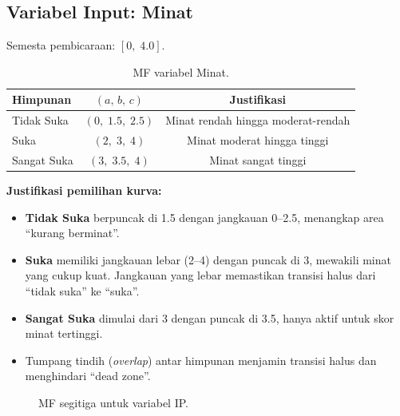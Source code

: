 \documentclass[conference]{IEEEtran}
\begin{document}
\subsection{Variabel Input: Minat}

Semesta pembicaraan: $[0,\;4.0]$.

\begin{table}[htbp]
\centering\caption{MF variabel Minat.}
\label{tab:mf-minat}
\begin{tabular}{@{}lcc@{}}
\toprule
Himpunan & $(a,\,b,\,c)$ & Justifikasi \\
\midrule
Tidak Suka  & $(0,\;1.5,\;2.5)$ & Minat rendah hingga moderat-rendah \\
Suka        & $(2,\;3,\;4)$          & Minat moderat hingga tinggi \\
Sangat Suka & $(3,\;3.5,\;4)$      & Minat sangat tinggi \\
\bottomrule
\end{tabular}
\end{table}

\noindent\textbf{Justifikasi pemilihan kurva:}
\begin{itemize}[nosep,leftmargin=*]
  \item \textbf{Tidak Suka} berpuncak di 1.5 dengan jangkauan
        0--2.5, menangkap area ``kurang berminat''.
  \item \textbf{Suka} memiliki jangkauan lebar (2--4) dengan puncak
        di 3, mewakili minat yang cukup kuat. Jangkauan yang lebar
        memastikan transisi halus dari ``tidak suka'' ke ``suka''.
  \item \textbf{Sangat Suka} dimulai dari 3 dengan puncak di 3.5,
        hanya aktif untuk skor minat tertinggi.
  \item Tumpang tindih (\emph{overlap}) antar himpunan menjamin
        transisi halus dan menghindari ``dead zone''.
\end{itemize}

\begin{figure}[htbp]
\centering
{}
\caption{MF segitiga untuk variabel IP.}
\label{fig:mf-ip}
\end{figure}
\end{document}
